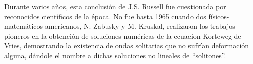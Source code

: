 Durante varios años, esta conclusión de J.S. Russell fue cuestionada por reconocidos científicos de la época. No fue hasta 1965 cuando dos físicos-matemáticos
americanos, N. Zabusky y M. Kruskal, realizaron los trabajos pioneros en la obtención de soluciones numéricas de la ecuacion Korteweg-de Vries, demostrando la existencia de ondas solitarias que no sufrían deformación alguna, dándole el nombre a dichas soluciones no lineales de “solitones”.

